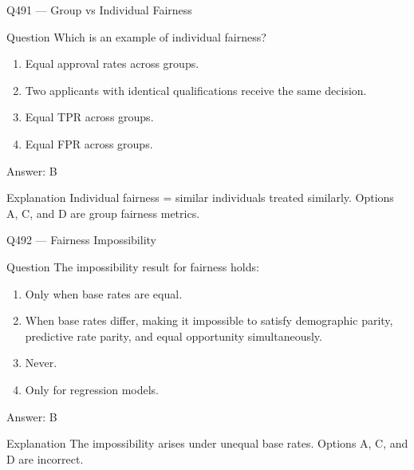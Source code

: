 \documentclass[aspectratio=169,8pt]{beamer}
\begin{document}
	\begin{frame}{Q491 --- Group vs Individual Fairness}
		\begin{block}{Question}
			Which is an example of individual fairness?
			\begin{enumerate}
				\item Equal approval rates across groups.
				\item Two applicants with identical qualifications receive the same decision.
				\item Equal TPR across groups.
				\item Equal FPR across groups.
			\end{enumerate}
		\end{block}
		\begin{exampleblock}{Answer: B}\end{exampleblock}
		\begin{block}{Explanation}
			Individual fairness = similar individuals treated similarly. Options A, C, and D are group fairness metrics.
		\end{block}
	\end{frame}
	
	\begin{frame}{Q492 --- Fairness Impossibility}
		\begin{block}{Question}
			The impossibility result for fairness holds:
			\begin{enumerate}
				\item Only when base rates are equal.
				\item When base rates differ, making it impossible to satisfy demographic parity, predictive rate parity, and equal opportunity simultaneously.
				\item Never.
				\item Only for regression models.
			\end{enumerate}
		\end{block}
		\begin{exampleblock}{Answer: B}\end{exampleblock}
		\begin{block}{Explanation}
			The impossibility arises under unequal base rates. Options A, C, and D are incorrect.
		\end{block}
	\end{frame}
	
\end{document}
